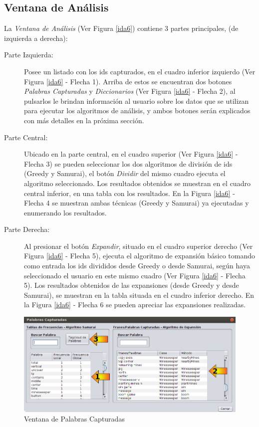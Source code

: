 \subsection{Ventana de Análisis}

La \textit{Ventana de Análisis} (Ver Figura \ref{ida6}) contiene 3 partes principales, (de izquierda a derecha):

\begin{description}

\item[Parte Izquierda:] Posee un listado con los ids capturados, en el cuadro inferior izquierdo (Ver Figura \ref{ida6} - Flecha 1). Arriba de estos se encuentran dos botones \textit{Palabras Capturadas} y \textit{Diccionarios} (Ver Figura \ref{ida6} - Flecha 2), al pulsarlos le brindan información al usuario sobre los datos que se utilizan para ejecutar los algoritmos de análisis, y ambos botones serán explicados con más detalles en la próxima sección.

\item[Parte Central:] Ubicado en la parte central, en el cuadro superior (Ver Figura \ref{ida6} - Flecha 3) se pueden seleccionar los dos algoritmos de división de ids (Greedy y Samurai), el botón \textit{Dividir} del mismo cuadro ejecuta el algoritmo seleccionado. Los resultados obtenidos se muestran en el cuadro central inferior, en una tabla con los resultados. En la Figura \ref{ida6} - Flecha 4 se muestran ambas técnicas (Greedy y Samurai) ya ejecutadas y enumerando los resultados.

\item[Parte Derecha:] Al presionar el botón \textit{Expandir}, situado en el cuadro superior derecho (Ver Figura \ref{ida6} - Flecha 5), ejecuta el algoritmo de expansión básico tomando como entrada los ids divididos desde Greedy o desde Samurai, según haya seleccionado el usuario en este mismo cuadro (Ver Figura \ref{ida6} - Flecha 5). Los resultados obtenidos de las expansiones (desde Greedy y desde Samurai), se muestran en la tabla situada en el cuadro inferior derecho. En la Figura \ref{ida6} - Flecha 6 se pueden apreciar las expansiones realizadas.

\end{description}

\begin{figure}[t] %
\centerline{%
\includegraphics[scale= 0.55]{./cap4/ida_07.png}
}
\caption{Ventana de Palabras Capturadas}
\label{ida7}
\end{figure}

